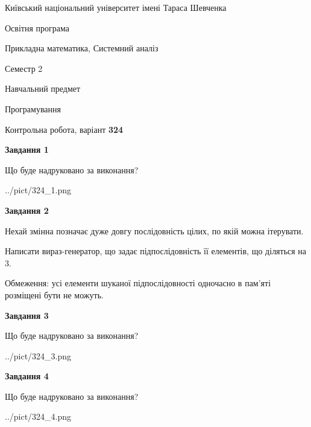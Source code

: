 \documentclass[12pt, ukrainian]{article}
\begin{document}
{{\begin {small}\par
{ \center  Київський національний університет імені Тараса Шевченка \par}
{\parbox {5 cm}{Освітня програма \hfill}{\parbox {8 cm}{Прикладна математика, Системний аналіз \hfill}}\parbox {5 cm}{\hfill Семестр 2}}\par
{\parbox {5 cm} {Навчальний предмет \hfill}\parbox {7 cm}{Програмування \hfill}\parbox {6cm}{\hfill}\par}\vspace{-7pt} \end{small}}{\center Контрольна робота, варіант  \No \textbf
{ 324 }\par}}
{
\begin {large}
{\begin {center}\textbf{Завдання 1}\end {center}}\par
Що буде надруковано за виконання?\par\par
\begin{center}
	{../pict/324_1.png}
\end{center}
\newpage

{\begin {center}\textbf{Завдання 2}\end {center}}\par
Нехай змінна  позначає дуже довгу послідовність цілих, по якій можна ітерувати.

Написати вираз-генератор, що задає підпослідовність її елементів, що діляться на 3.

Обмеження: усі елементи шуканої підпослідовності одночасно в пам'яті розміщені бути не можуть.\par
\newpage

{\begin {center}\textbf{Завдання 3}\end {center}}\par
Що буде надруковано за виконання?
\begin{center}
	{../pict/324_3.png}
\end{center}
\newpage

{\begin {center}\textbf{Завдання 4}\end {center}}\par
Що буде надруковано за виконання?\par
\begin{center}
	{../pict/324_4.png}
\end{center}
\newpage


\end{large}}
\end{document}
